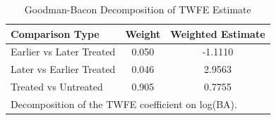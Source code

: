 \begin{table}[htbp]
\centering
\caption{Goodman-Bacon Decomposition of TWFE Estimate}
\label{tab:bacon}
\begin{tabular}{lcc}
\hline\hline
Comparison Type & Weight & Weighted Estimate \\
\hline
Earlier vs Later Treated & 0.050 & -1.1110 \\
Later vs Earlier Treated & 0.046 & 2.9563 \\
Treated vs Untreated & 0.905 & 0.7755 \\
\hline\hline
\multicolumn{3}{l}{\footnotesize Decomposition of the TWFE coefficient on log(BA).} \\
\end{tabular}
\end{table}

